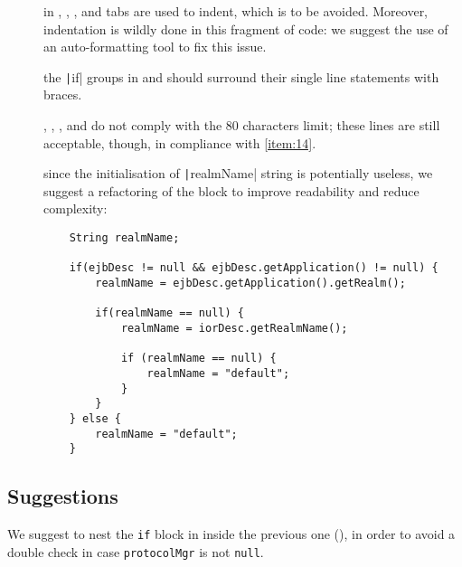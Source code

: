 
\begin{description}

	\item [] 
		in , , , and   tabs are used to indent, which is to be avoided. Moreover, indentation is wildly done in this fragment of code: we suggest the use of an auto-formatting tool to fix this issue.
		
	\item [] 
		the \texttt|if| groups in  and  should surround their single line statements with braces.
	
	\item []
		, 	, , and  do not comply with the 80 characters limit; these lines are still acceptable, though, in compliance with \cref{item:14}.

	\item [] 
		since the initialisation of \texttt|realmName| string is potentially useless, we suggest a refactoring of the block  to improve readability and reduce complexity:\begin{verbatim}
	String realmName;

	if(ejbDesc != null && ejbDesc.getApplication() != null) {
		realmName = ejbDesc.getApplication().getRealm();
		
		if(realmName == null) {
			realmName = iorDesc.getRealmName();
			
			if (realmName == null) {
				realmName = "default";
			}
		}
	} else {
		realmName = "default";
	}
	\end{verbatim}

\end{description}


\subsection{Suggestions}

We suggest to nest the \texttt{if} block in  inside the previous one (), in order to avoid a double check in case \texttt{protocolMgr} is not \texttt{null}.

